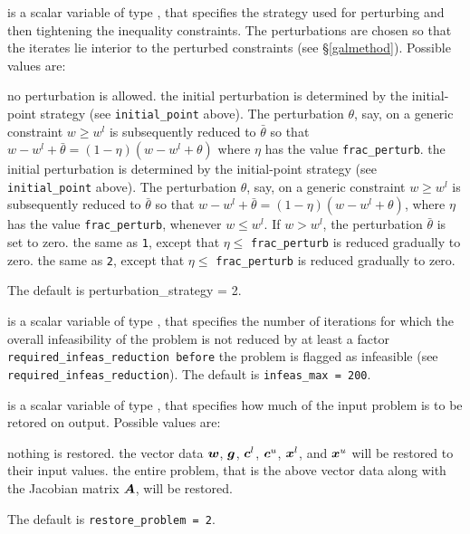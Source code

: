 \documentclass{galahad}
\begin{document}
\begin{description}

 is a scalar variable of type \integer, 
that specifies the strategy used for perturbing and then tightening
the inequality constraints. The perturbations are chosen so that the
iterates lie interior to the perturbed constraints (see \S\ref{galmethod}).
Possible values are:

\begin{description}
 no perturbation is allowed.
 the initial perturbation is determined by the initial-point
strategy (see {\tt initial\_point} above). The perturbation $\theta$, say,
on a generic constraint $w \geq w^l$ is subsequently 
reduced to $\bar{\theta}$ so that $w - w^l + \bar{\theta}
= ( 1 - \eta ) ( w - w^l + \theta )$
where $\eta$ has the value {\tt frac\_perturb}.
 the initial perturbation is determined by the initial-point
strategy (see {\tt initial\_point} above). The perturbation $\theta$, say,
on a generic constraint $w \geq w^l$ is subsequently 
reduced to $\bar{\theta}$ so that $w - w^l + \bar{\theta}
= ( 1 - \eta ) ( w - w^l + \theta )$,
where $\eta$ has the value {\tt frac\_perturb}, whenever $w \leq w^l$. If 
$w > w^l$, the perturbation  $\bar{\theta}$ is set to zero.
 the same as {\tt 1}, except that $\eta \leq$ {\tt frac\_perturb}
is reduced gradually to zero.
 the same as {\tt 2}, except that $\eta \leq$ {\tt frac\_perturb}
is reduced gradually to zero.
\end{description}
The default is {perturbation\_strategy = 2}.


 is a scalar variable of type \integer, that specifies
the number of iterations for which the overall infeasibility
of the problem is not reduced by at least a factor 
{\tt required\_infeas\_reduction
before} the problem is flagged as infeasible 
(see {\tt required\_infeas\_reduction}).
The default is {\tt infeas\_max = 200}.

 is a scalar variable of type \integer, that 
specifies how much of the input problem is to be retored on output. 
Possible values are:
\begin{description}
 nothing is restored. 
 the vector data ${\bm{w}}$, ${\bm{g}}$, 
   ${\bm{c}}^{l}$, ${\bm{c}}^{u}$, ${\bm{x}}^{l}$, and ${\bm{x}}^{u}$ 
   will be restored to their input values.
 the entire problem, that is the above vector data along with 
the Jacobian matrix ${\bm{A}}$, will be restored.
\end{description}
The default is {\tt restore\_problem = 2}.


\end{description}
\end{document}
